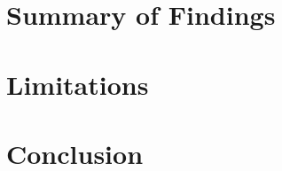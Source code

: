 \section{Summary of Findings}\label{summary-of-findings}

\section{Limitations}\label{limitations}

\section{Conclusion}\label{conclusion}
